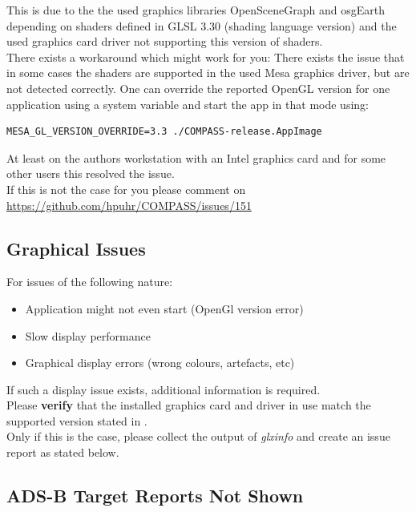 This is due to the the used graphics libraries OpenSceneGraph and osgEarth depending on shaders defined in GLSL 3.30 (shading language version) and the used graphics card driver not supporting this version of shaders. \\

There exists a workaround which might work for you: There exists the issue that in some cases the shaders are supported in the used Mesa graphics driver, but are not detected correctly. One can override the reported OpenGL version for one application using a system variable and start the app in that mode using:

\begin{lstlisting}
MESA_GL_VERSION_OVERRIDE=3.3 ./COMPASS-release.AppImage
\end{lstlisting}

At least on the authors workstation with an Intel graphics card and for some other users this resolved the issue. \\

If this is not the case for you please comment on \url{https://github.com/hpuhr/COMPASS/issues/151}

\subsection{Graphical Issues}

For issues of the following nature:

\begin{itemize} 
\item Application might not even start (OpenGl version error)
\item Slow display performance
\item Graphical display errors (wrong colours, artefacts, etc) 
\end{itemize} 

If such a display issue exists, additional information is required. \\

Please \textbf{verify} that the installed graphics card and driver in use match the supported version stated in . \\

Only if this is the case, please collect the output of \textit{glxinfo} and create an issue report as stated below.

\subsection{ADS-B Target Reports Not Shown}

